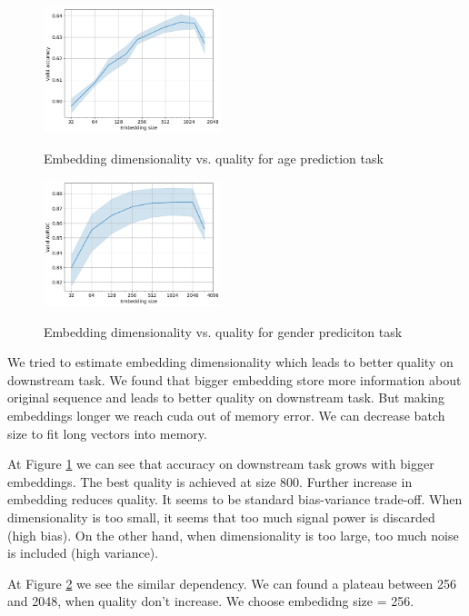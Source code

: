 \documentclass[sigconf, anonymous]{acmart}
\begin{document}
\begin{figure}[ht]
  \caption{Embedding dimensionality vs. quality for age prediction task}
  \includegraphics[width=0.46\textwidth]{figures/age-pred-hidden-size.png}
  \label{fig-emb-dim-age}
\end{figure}

\begin{figure}[ht]
  \caption{Embedding dimensionality vs. quality for gender prediciton task}
  \includegraphics[width=0.46\textwidth]{figures/gender-hidden-size.png}
  \label{fig-emb-dim-gender}
\end{figure}

We tried to estimate embedding dimensionality which leads to better quality on downstream task. We found that bigger embedding store more information about original sequence and leads to better quality on downstream task. But making embeddings longer we reach cuda out of memory error. We can decrease batch size to fit long vectors into memory.

At Figure \ref{fig-emb-dim-age} we can see that accuracy on downstream task grows with bigger embeddings. The best quality is achieved at size 800. Further increase in embedding reduces quality.
It seems to be standard bias-variance trade-off. When dimensionality is too small, it seems that too much signal power is discarded (high bias). On the
other hand, when dimensionality is too large, too much noise is included (high variance).

At Figure \ref{fig-emb-dim-gender} we see the similar dependency. We can found a plateau between 256 and 2048, when quality don't increase. We choose embedidng size = 256.
\end{document}
